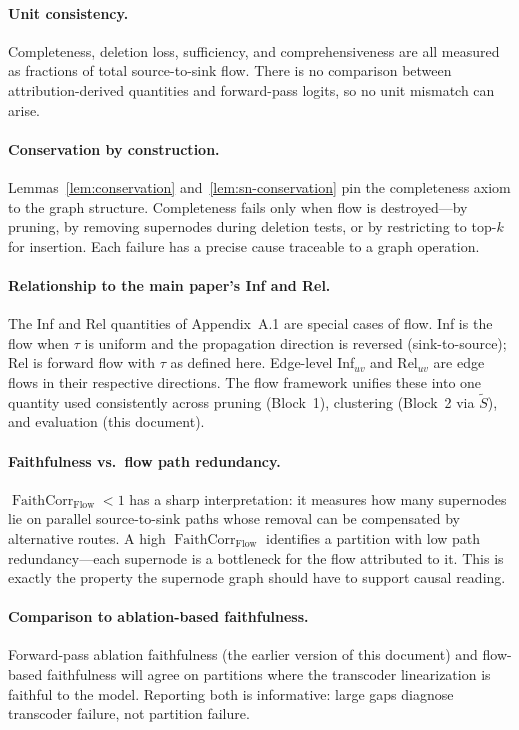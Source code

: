 \documentclass[11pt]{article}
\DeclareMathOperator{\Flow}{Flow}
\DeclareMathOperator{\FaithCorr}{FaithCorr}
\begin{document}
\paragraph{Unit consistency.}
Completeness, deletion loss, sufficiency, and comprehensiveness are
all measured as fractions of total source-to-sink flow. There is no
comparison between attribution-derived quantities and forward-pass
logits, so no unit mismatch can arise.

\paragraph{Conservation by construction.}
Lemmas~\ref{lem:conservation} and~\ref{lem:sn-conservation} pin the
completeness axiom to the graph structure. Completeness fails only
when flow is destroyed---by pruning, by removing supernodes during
deletion tests, or by restricting to top-$k$ for insertion. Each
failure has a precise cause traceable to a graph operation.

\paragraph{Relationship to the main paper's Inf and Rel.}
The Inf and Rel quantities of Appendix~A.1 are special cases of
flow. Inf is the flow when $\tau$ is uniform and the propagation
direction is reversed (sink-to-source); Rel is forward flow with
$\tau$ as defined here. Edge-level Inf$_{uv}$ and Rel$_{uv}$ are
edge flows in their respective directions. The flow framework
unifies these into one quantity used consistently across pruning
(Block~1), clustering (Block~2 via $\tilde S$), and evaluation
(this document).

\paragraph{Faithfulness vs.\ flow path redundancy.}
$\FaithCorr_{\Flow} < 1$ has a sharp interpretation: it measures how
many supernodes lie on parallel source-to-sink paths whose removal
can be compensated by alternative routes. A high
$\FaithCorr_{\Flow}$ identifies a partition with low path
redundancy---each supernode is a bottleneck for the flow attributed
to it. This is exactly the property the supernode graph should have
to support causal reading.

\paragraph{Comparison to ablation-based faithfulness.}
Forward-pass ablation faithfulness (the earlier version of this
document) and flow-based faithfulness will agree on partitions
where the transcoder linearization is faithful to the model.
Reporting both is informative: large gaps diagnose transcoder
failure, not partition failure.
\end{document}
